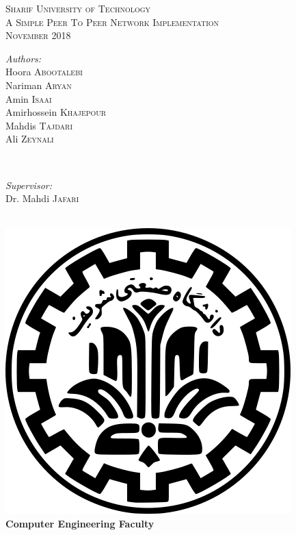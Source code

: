 \documentclass{article}
\begin{document}
\begin{titlepage}
\begin{center}
\textsc{\LARGE Sharif University of Technology}\\[1.5cm]
\textsc{\Large A Simple Peer To Peer Network Implementation}\\[0.5cm]
\textsc{\large November 2018}\\

\begin{minipage}{0.4\textwidth}
\begin{flushleft} \large
\emph{Authors:}\\
Hoora  \textsc{Abootalebi}\\
Nariman  \textsc{Aryan}\\
Amin \textsc{Isaai}\\
Amirhossein \textsc{Khajepour}\\
Mahdis \textsc{Tajdari}\\
Ali  \textsc{Zeynali} %
\end{flushleft}
\end{minipage}
~
\begin{minipage}{0.4\textwidth}
\begin{flushright} \large
\emph{Supervisor:} \\
Dr. Mahdi \textsc{Jafari} %
\end{flushright}
\end{minipage}\\[2cm]
\includegraphics[scale=0.15]{sharif-logo.png}\\
\textbf{Computer Engineering Faculty}
\end{center}
\end{titlepage}
\large
\clearpage
\tableofcontents
\clearpage
\end{document}
